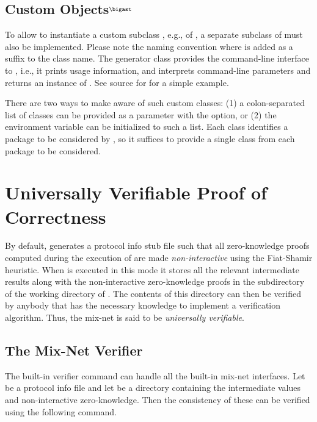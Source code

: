 \documentclass[11pt]{article}
\newcommand{\MARK}{$^\bigast$}
\begin{document}
\subsection{Custom Objects\MARK}

To allow \vog{} to instantiate a custom subclass ,
e.g., of , a separate subclass  of
 must also be implemented. Please
note the naming convention where  is added as a suffix to
the class name. The generator class provides the command-line
interface to , i.e., it prints usage information,
and interprets command-line parameters and returns an instance of
. See source for  for
a simple example.

There are two ways to make \vog{} aware of such custom classes: (1) a
colon-separated list of classes can be provided as a parameter with
the  option, or (2) the environment variable
 can be initialized to such a list. Each class
identifies a package to be considered by \vog{}, so it suffices to
provide a single class from each package to be considered.


\section{Universally Verifiable Proof of Correctness}

By default, \vmni{} generates a protocol info stub file such that all
zero-knowledge proofs computed during the execution of \vmn{} are made
\emph{non-interactive} using the Fiat-Shamir heuristic. When \vmn{} is
executed in this mode it stores all the relevant intermediate results
along with the non-interactive zero-knowledge proofs in the
 subdirectory of the working directory of \vmn{}. The
contents of this directory can then be verified by anybody that has
the necessary knowledge to implement a verification algorithm. Thus,
the \veri mix-net is said to be \emph{universally verifiable}. 

\subsection{The \veri Mix-Net Verifier}

The \veri built-in verifier command \vmnv{} can handle all the
built-in mix-net interfaces. Let  be a protocol
info file and let  be a directory containing the
intermediate values and non-interactive zero-knowledge. Then the
consistency of these can be verified using the following command.
\end{document}

